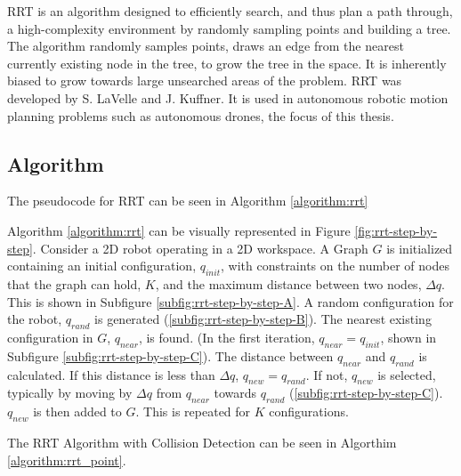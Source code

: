 
\ac{RRT} is an algorithm designed to efficiently search, and thus plan a path through, a high-complexity environment by randomly sampling points and building a tree. The algorithm randomly samples points, draws an edge from the nearest currently existing node in the tree, to grow the tree in the space. It is inherently biased to grow towards large unsearched areas of the problem. RRT was developed by S. LaVelle\cite{LaValle1998} and J. Kuffner\cite{LaValle2001}. It is used in autonomous robotic motion planning problems such as autonomous drones, the focus of this thesis.

\subsection{Algorithm}

    The pseudocode for \ac{RRT} can be seen in Algorithm \ref{algorithm:rrt}
    

    Algorithm \ref{algorithm:rrt} can be visually represented in Figure \ref{fig:rrt-step-by-step}. Consider a \ac{2D} robot operating in a \ac{2D} workspace. A Graph $G$ is initialized containing an initial configuration, $q_{init}$, with constraints on the number of nodes that the graph can hold, $K$, and the maximum distance between two nodes, $\Delta q$. This is shown in Subfigure \ref{subfig:rrt-step-by-step-A}. A random configuration for the robot, $q_{rand}$ is generated (\ref{subfig:rrt-step-by-step-B}). The nearest existing configuration in $G$, $q_{near}$, is found. (In the first iteration, $q_{near} = q_{init}$, shown in Subfigure \ref{subfig:rrt-step-by-step-C}). The distance between $q_{near}$ and $q_{rand}$ is calculated. If this distance is less than $\Delta q$, $q_{new} = q_{rand}$. If not, $q_{new}$ is selected, typically by moving by $\Delta q$ from $q_{near}$ towards $q_{rand}$ (\ref{subfig:rrt-step-by-step-C}). $q_{new}$ is then added to $G$. This is repeated for $K$ configurations.

    

    \newpage %

    The RRT Algorithm with Collision Detection can be seen in Algorthim \ref{algorithm:rrt_point}.
    

